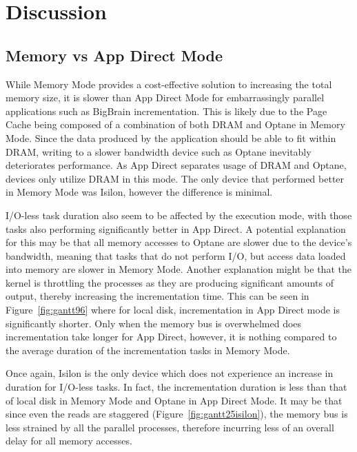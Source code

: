 \documentclass[conference]{IEEEtran}
\newcommand{\bigbrain}{BigBrain\xspace}
\begin{document}
\section{Discussion}
\subsection{Memory vs App Direct Mode}

While Memory Mode provides a cost-effective solution to increasing the total memory
size, it is slower than App Direct Mode for embarrassingly parallel applications such
as \bigbrain incrementation. This is likely due to the Page Cache being composed of a
combination of both DRAM and Optane in Memory Mode. Since the data produced by the application should be
able to fit within DRAM, writing to a slower bandwidth device such as Optane inevitably
deteriorates performance. As App Direct separates usage of DRAM and Optane, devices only utilize DRAM in this mode.
The only device that performed better in Memory Mode was 
Isilon, however the difference is minimal.

I/O-less task duration also seem to be affected by the execution mode, with those tasks
also performing significantly better in App Direct. A potential explanation for this may be 
that all memory accesses to Optane are slower due to the device's bandwidth, meaning that
tasks that do not perform I/O, but access data loaded into memory are slower in Memory Mode. Another explanation might be that the kernel is throttling the processes
as they are producing significant amounts of output, thereby increasing the
incrementation time.
This can be seen in Figure~\ref{fig:gantt96} where for local disk, incrementation in App Direct
mode is significantly shorter. Only when the memory bus is overwhelmed does incrementation take
longer for App Direct, however, it is nothing compared to the average duration of the incrementation
tasks in Memory Mode. 

Once again, Isilon is the only device which does not experience an increase in duration for
I/O-less tasks. In fact, the incrementation duration is less than that of local disk in Memory Mode
and Optane in App Direct Mode. It may be that since even the reads are staggered
(Figure~\ref{fig:gantt25isilon}), the memory bus is less strained by all the parallel processes,
therefore incurring less of an overall delay for all memory accesses.
\end{document}
